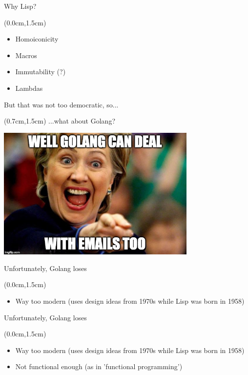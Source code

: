 \documentclass[xetex,14pt,aspectratio=169]{beamer}
\begin{document}
\begin{frame}{Why Lisp?}
\begin{textblock*}{\framewidth-0.8cm}(0.0cm,1.5cm) %
\begin{itemize}
  \item Homoiconicity
  \item Macros
  \item Immutability (?)
  \item Lambdas
\end{itemize}
\end{textblock*}
\end{frame}

\begin{frame}{But that was not too democratic, so...}
\begin{textblock*}{\framewidth-0.8cm}(0.7cm,1.5cm) %
...what about Golang?
\begin{minipage}{\textwidth}
  \centering
  \includegraphics[height=6.6cm]{img/hillary}
\end{minipage}
\end{textblock*}
\end{frame}

\begin{frame}{Unfortunately, Golang loses}
\begin{textblock*}{\framewidth-0.8cm}(0.0cm,1.5cm) %
\begin{itemize}
  \item Way too modern (uses design ideas from 1970s while Lisp was born in 1958)
\end{itemize}
\end{textblock*}
\end{frame}

\begin{frame}{Unfortunately, Golang loses}
\begin{textblock*}{\framewidth-0.8cm}(0.0cm,1.5cm) %
\begin{itemize}
  \item Way too modern (uses design ideas from 1970s while Lisp was born in 1958)
  \item Not functional enough (as in 'functional programming')
\end{itemize}
\end{textblock*}
\end{frame}
\end{document}

